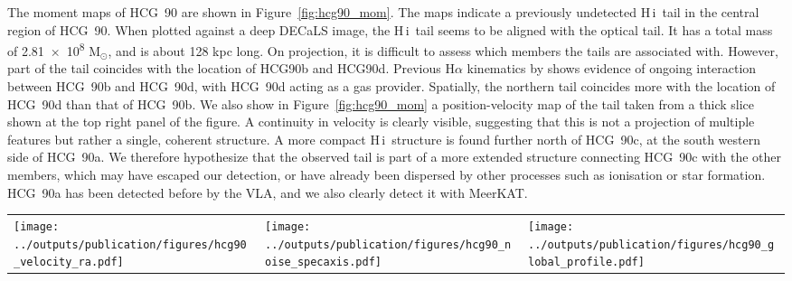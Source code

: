 \documentclass{aa}
\newcommand{\HI}{H\,{\sc i}}
\begin{document}
The moment maps of HCG~90 are shown in Figure~\ref{fig:hcg90_mom}. The maps indicate a previously undetected \HI\ tail in the central region of HCG~90. When plotted against a deep DECaLS image, 
the \HI\ tail seems to be aligned with the optical tail. It has a total mass of \qty{2.81e+8}{} $\mathrm{M_{\odot}}$, and is about 128 kpc long. On projection, it is difficult to assess which members the tails are associated with. However, 
part of the tail coincides with the location of HCG90b and HCG90d. Previous H$\alpha$ kinematics by \citet{1998AJ....116.2123P} shows evidence of ongoing interaction 
between HCG~90b and HCG~90d, with HCG~90d acting as a gas provider. Spatially, the northern tail coincides more with the location of HCG~90d than that of HCG~90b. 
We also show in Figure~\ref{fig:hcg90_mom} a position-velocity map of the tail taken from a thick slice shown at the top right panel of the figure. A continuity in velocity 
is clearly visible, suggesting that this is not a projection of multiple features but rather a single, coherent structure. A more 
compact \HI\ structure is found further north of HCG~90c, at the south western side of HCG~90a. 
We therefore hypothesize that the observed tail is part of a more extended structure connecting HCG~90c with the other members, which may have escaped our detection, 
or have already been dispersed by other processes such as ionisation or star formation.
HCG~90a has been detected before by the VLA, and we also clearly detect it with MeerKAT. 
\begin{figure*}
\setlength{\tabcolsep}{0pt}
\begin{tabular}{l l l}
    \texttt{[image: ../outputs/publication/figures/hcg90\_velocity\_ra.pdf]} &
    \texttt{[image: ../outputs/publication/figures/hcg90\_noise\_specaxis.pdf]}&
    \texttt{[image: ../outputs/publication/figures/hcg90\_global\_profile.pdf]}
  \end{tabular}
  \caption{Left panel: velocity vs right ascension of HCG~90. Middle panel: median noise values of each RA-DEC slice of the non-primary beam corrected \SI{60}{\arcsecond} data cube of 
  HCG 90 as a function of velocity. The horizontal dashed line indicates the median of all the noise values from each slice. Right panel: the blue solid lines indicates the 
  MeerKAT integrated spectrum of HCG~90; the red solid line indicates VLA integrated spectrum of the group derived by \citep{2023A&A...670A..21J}. 
  The vertical dotted lines indicate the velocities of the galaxies in the core of the group. The spectra have been extracted from areas containing only genuine \HI\ emission.}
  \label{fig:hcg90_noise}
 \end{figure*}
\end{document}
